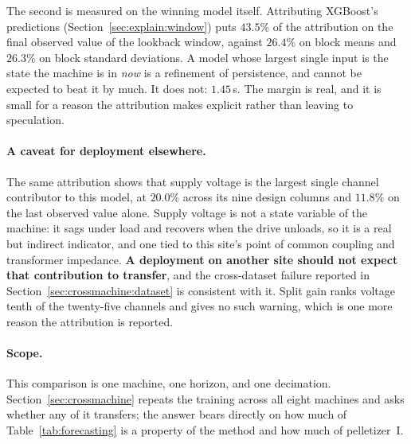 The second is measured on the winning model itself. Attributing
XGBoost's predictions (Section~\ref{sec:explain:window}) puts $43.5\%$
of the attribution on the final observed value of the lookback window,
against $26.4\%$ on block means and $26.3\%$ on block standard
deviations. A model whose largest single input is the state the machine
is in \emph{now} is a refinement of persistence, and cannot be expected
to beat it by much. It does not: $1.45$\,s. The margin is real, and it
is small for a reason the attribution makes explicit rather than leaving
to speculation.

\paragraph{A caveat for deployment elsewhere.}
The same attribution shows that supply voltage is the largest single
channel contributor to this model, at $20.0\%$ across its nine design
columns and $11.8\%$ on the last observed value alone. Supply voltage is
not a state variable of the machine: it sags under load and recovers
when the drive unloads, so it is a real but indirect indicator, and one
tied to this site's point of common coupling and transformer impedance.
\textbf{A deployment on another site should not expect that contribution
to transfer}, and the cross-dataset failure reported in
Section~\ref{sec:crossmachine:dataset} is consistent with it. Split gain
ranks voltage tenth of the twenty-five channels and gives no such
warning, which is one more reason the attribution is reported.

\paragraph{Scope.}
This comparison is one machine, one horizon, and one decimation.
Section~\ref{sec:crossmachine} repeats the training across all eight
machines and asks whether any of it transfers; the answer bears directly
on how much of Table~\ref{tab:forecasting} is a property of the method
and how much of pelletizer~I.
